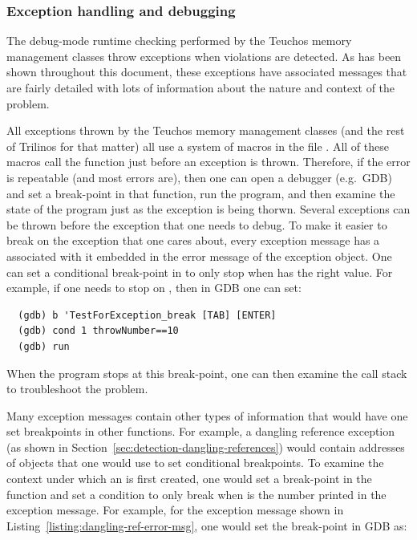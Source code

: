 \documentclass[pdf,ps2pdf,11pt]{SANDreport}
\begin{document}
%
{}\subsubsection{Exception handling and debugging}
\label{sec:except-handling-debugging}
%

The debug-mode runtime checking performed by the Teuchos memory
management classes throw exceptions when violations are detected.  As
has been shown throughout this document, these exceptions have
associated messages that are fairly detailed with lots of information
about the nature and context of the problem.

All exceptions thrown by the Teuchos memory management classes (and
the rest of Trilinos for that matter) all use a system of macros in
the file {}.  All of these macros
call the function {} just before an
exception is thrown.  Therefore, if the error is repeatable (and most
errors are), then one can open a debugger (e.g.\ GDB) and set a
break-point in that function, run the program, and then examine the
state of the program just as the exception is being thorwn.  Several
exceptions can be thrown before the exception that one needs to debug.
To make it easier to break on the exception that one cares about,
every exception message has a {} associated with it
embedded in the error message of the exception object.  One can set a
conditional break-point in {} to
only stop when {} has the right value.  For example,
if one needs to stop on {}, then in GDB one can
set:

{\small\begin{verbatim}
  (gdb) b 'TestForException_break [TAB] [ENTER]
  (gdb) cond 1 throwNumber==10
  (gdb) run
\end{verbatim}}

When the program stops at this break-point, one can then examine the
call stack to troubleshoot the problem.

Many exception messages contain other types of information that would
have one set breakpoints in other functions.  For example, a dangling
reference exception (as shown in
Section~\ref{sec:detection-dangling-references}) would contain
addresses of objects that one would use to set conditional
breakpoints.  To examine the context under which an {} is
first created, one would set a break-point in the function
{} and set a condition
to only break when {} is the number printed in
the exception message.  For example, for the exception message shown
in Listing~\ref{listing:dangling-ref-error-msg}, one would set the
break-point in GDB as:
\end{document}
